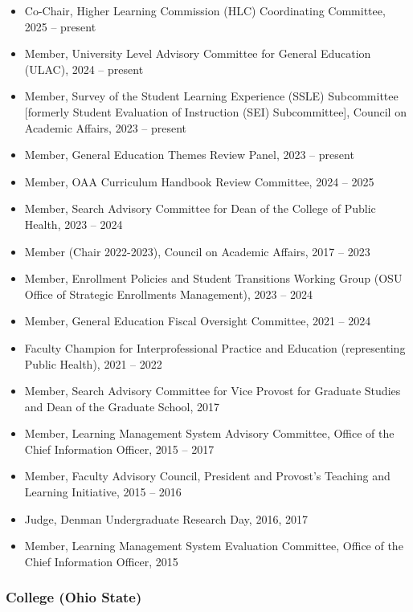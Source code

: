 \documentclass[
  english,
  letterpaper,
  DIV=11,
  numbers=noendperiod]{scrartcl}
\providecommand{\tightlist}{%
  \setlength{\itemsep}{0pt}\setlength{\parskip}{0pt}}
\begin{document}
\begin{itemize}
\tightlist
\item
  Co-Chair, Higher Learning Commission (HLC) Coordinating Committee,
  2025 -- present
\item
  Member, University Level Advisory Committee for General Education
  (ULAC), 2024 -- present
\item
  Member, Survey of the Student Learning Experience (SSLE) Subcommittee
  {[}formerly Student Evaluation of Instruction (SEI) Subcommittee{]},
  Council on Academic Affairs, 2023 -- present
\item
  Member, General Education Themes Review Panel, 2023 -- present
\item
  Member, OAA Curriculum Handbook Review Committee, 2024 -- 2025
\item
  Member, Search Advisory Committee for Dean of the College of Public
  Health, 2023 -- 2024
\item
  Member (Chair 2022-2023), Council on Academic Affairs, 2017 -- 2023
\item
  Member, Enrollment Policies and Student Transitions Working Group (OSU
  Office of Strategic Enrollments Management), 2023 -- 2024
\item
  Member, General Education Fiscal Oversight Committee, 2021 -- 2024
\item
  Faculty Champion for Interprofessional Practice and Education
  (representing Public Health), 2021 -- 2022
\item
  Member, Search Advisory Committee for Vice Provost for Graduate
  Studies and Dean of the Graduate School, 2017
\item
  Member, Learning Management System Advisory Committee, Office of the
  Chief Information Officer, 2015 -- 2017
\item
  Member, Faculty Advisory Council, President and Provost's Teaching and
  Learning Initiative, 2015 -- 2016
\item
  Judge, Denman Undergraduate Research Day, 2016, 2017
\item
  Member, Learning Management System Evaluation Committee, Office of the
  Chief Information Officer, 2015
\end{itemize}

\subsubsection{College (Ohio State)}\label{college-ohio-state}
\end{document}
